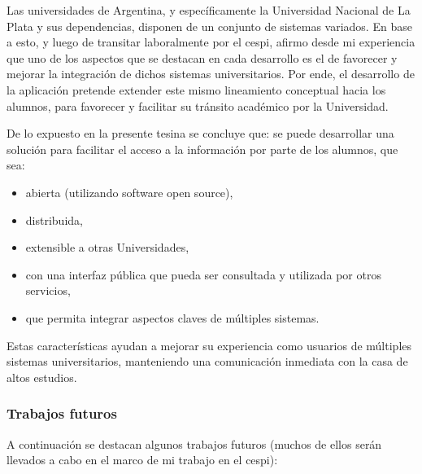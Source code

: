 
Las universidades de Argentina, y específicamente la Universidad Nacional de La Plata y sus dependencias, disponen de un conjunto de sistemas variados. En base a esto, y luego de transitar laboralmente por el \gls{cespi}, afirmo desde mi experiencia que uno de los aspectos que se destacan en cada desarrollo es el de favorecer y mejorar la integración de dichos sistemas universitarios. Por ende, el desarrollo de la aplicación \nombreApp{} pretende extender este mismo lineamiento conceptual hacia los alumnos, para favorecer y facilitar su tránsito académico por la Universidad.

De lo expuesto en la presente tesina se concluye que: se puede desarrollar una solución para facilitar el acceso a la información por parte de los alumnos, que sea:
\begin{itemize}
\item abierta (utilizando software \gls{open source}),
\item distribuida,
\item extensible a otras Universidades,
\item con una interfaz pública que pueda ser consultada y utilizada por otros servicios,
\item que permita integrar aspectos claves de múltiples sistemas.
\end{itemize}
Estas características ayudan a mejorar su experiencia como usuarios de múltiples sistemas universitarios, manteniendo una comunicación inmediata con la casa de altos estudios.

\subsubsection{Trabajos futuros}
\label{trabajos_futuros}

A continuación se destacan algunos trabajos futuros (muchos de ellos serán llevados a cabo en el marco de mi trabajo en el \gls{cespi}):

